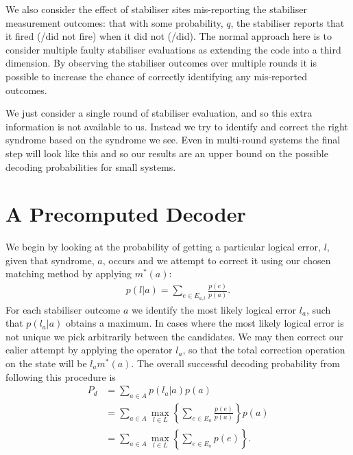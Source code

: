 We also consider the effect of stabiliser sites mis-reporting the stabiliser measurement outcomes: that with some probability, $q$, the stabiliser reports that it fired (/did not fire) when it did not (/did). The normal approach here is to consider multiple faulty stabiliser evaluations as extending the code into a third dimension. By observing the stabiliser outcomes over multiple rounds it is possible to increase the chance of correctly identifying any mis-reported outcomes.

We just consider a single round of stabiliser evaluation, and so this extra information is not available to us. Instead we try to identify and correct the right syndrome based on the syndrome we see. Even in multi-round systems the final step will look like this and so our results are an upper bound on the possible decoding probabilities for small systems.

\section{A Precomputed Decoder}

We begin by looking at the probability of getting a particular logical error, $l$, given that syndrome, $a$, occurs and we attempt to correct it using our chosen matching method by applying $m^*(a)$:
\begin{align}
  p(l \vert a) = \sum_{e \in E_{a,l}} \frac{p(e)}{p(a)}. 
\end{align}
For each stabiliser outcome $a$ we identify the most likely logical error $l_a$, such that $p(l_a \vert a)$ obtains a maximum. In cases where the most likely logical error is not unique we pick arbitrarily between the candidates. We may then correct our ealier attempt by applying the operator $l_a$, so that the total correction operation on the state will be $l_am^*(a)$. The overall successful decoding probability from following this procedure is 
\begin{align}
  P_d &= \sum_{a \in A} p(l_a \vert a)p(a) \\
  &= \sum_{a \in A} \max_{l\in L} \left\{ \sum_{e \in E_a} \frac{p(e)}{p(a)} \right\} p(a) \\
  &= \sum_{a \in A} \max_{l\in L} \left\{ \sum_{e \in E_a} p(e) \right\}. \label{truthful_prob}
\end{align}

